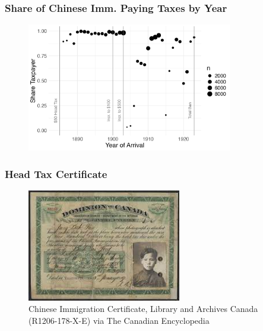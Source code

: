 \documentclass[xcolor=dvipsnames, compress, 12pt, aspectratio=169, handout]{beamer}
\begin{document}
\begin{frame}
    \label{figa1_taxpayer}
    \frametitle{Share of Chinese Imm. Paying Taxes by Year \hyperlink{headtaxinfo}{}}
    \centering
    \begin{figure}
        \includegraphics[width = 0.8\textwidth]{../../figs/slides/fig_taxpayers.png}
    \end{figure}
\end{frame}

\begin{frame}
    \label{fig_headtax}
    \frametitle{Head Tax Certificate \hyperlink{headtaxinfo}{}}
    \centering
    \begin{figure}
        \includegraphics[width = 0.6\textwidth]{../../figs/slides/headtax.jpeg}
        \caption{\footnotesize Chinese Immigration Certificate, Library and Archives Canada (R1206-178-X-E) via The Canadian Encyclopedia}
    \end{figure}
\end{frame}
\end{document}
